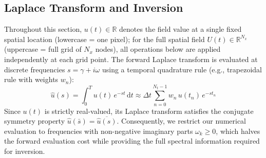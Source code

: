 ﻿\documentclass[a4paper,12pt]{article}
\theoremstyle{definition}
\theoremstyle{remark}
\newcommand{\R}{\mathbb{R}}
\begin{document}
\subsection{Laplace Transform and Inversion}
\label{sec:tikhonov}

Throughout this section, $u(t) \in \R$ denotes the field value at a single fixed spatial location (lowercase = one pixel); for the full spatial field $U(t) \in \R^{N_x}$ (uppercase = full grid of $N_x$ nodes), all operations below are applied independently at each grid point. The forward Laplace transform is evaluated at discrete frequencies $s = \gamma + i\omega$ using a temporal quadrature rule (e.g., trapezoidal rule with weights $w_n$):
\begin{equation}
    \hat{u}(s) = \int_0^T u(t)\,e^{-s t}\,\mathrm{d}t \approx \Delta t \sum_{n=0}^{N_t-1} w_n\, u(t_n)\, e^{-s t_n}
    \label{eq:laplace_fwd}
\end{equation}
Since $u(t)$ is strictly real-valued, its Laplace transform satisfies the conjugate symmetry property $\hat{u}(\bar{s}) = \overline{\hat{u}(s)}$. Consequently, we restrict our numerical evaluation to frequencies with non-negative imaginary parts $\omega_k \ge 0$, which halves the forward evaluation cost while providing the full spectral information required for inversion.
\end{document}

